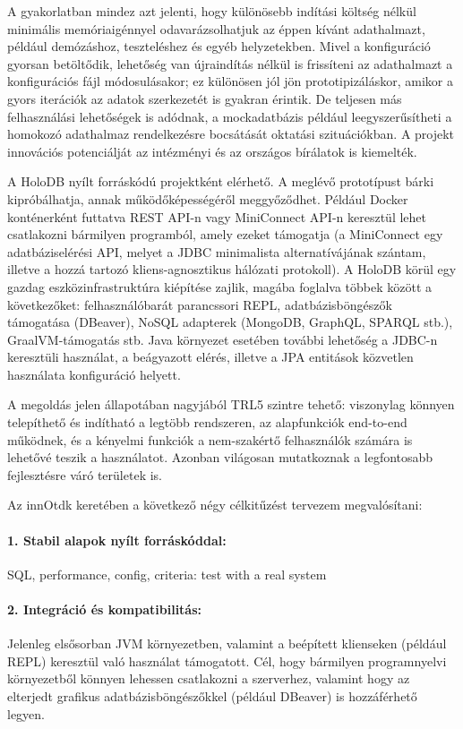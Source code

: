 \documentclass[12pt]{article}
\begin{document}
A gyakorlatban mindez azt jelenti, hogy különösebb indítási költség nélkül minimális memóriaigénnyel odavarázsolhatjuk az éppen kívánt adathalmazt, például demózáshoz, teszteléshez és egyéb helyzetekben.
Mivel a konfiguráció gyorsan betöltődik, lehetőség van újraindítás nélkül is frissíteni az adathalmazt a konfigurációs fájl módosulásakor; ez különösen jól jön prototipizáláskor, amikor a gyors iterációk az adatok szerkezetét is gyakran érintik.
De teljesen más felhasználási lehetőségek is adódnak, a mockadatbázis például leegyszerűsítheti a homokozó adathalmaz rendelkezésre bocsátását oktatási szituációkban.
A projekt innovációs potenciálját az intézményi és az országos bírálatok is kiemelték.

A HoloDB nyílt forráskódú projektként elérhető.
A meglévő prototípust bárki kipróbálhatja, annak működőképességéről meggyőződhet.
Például Docker konténerként futtatva REST API-n vagy MiniConnect API-n keresztül lehet csatlakozni bármilyen programból, amely ezeket támogatja
(a MiniConnect egy adatbáziselérési API, melyet a JDBC minimalista alternatívájának szántam, illetve a hozzá tartozó kliens-agnosztikus hálózati protokoll).
A HoloDB körül egy gazdag eszközinfrastruktúra kiépítése zajlik, magába foglalva többek között a következőket: felhasználóbarát parancssori REPL, adatbázisböngészők támogatása (DBeaver), NoSQL adapterek (MongoDB, GraphQL, SPARQL stb.), GraalVM-támogatás stb.
Java környezet esetében további lehetőség a JDBC-n keresztüli használat,
a beágyazott elérés, illetve a JPA entitások közvetlen használata konfiguráció helyett.

A megoldás jelen állapotában nagyjából TRL5 szintre tehető:
viszonylag könnyen telepíthető és indítható a legtöbb rendszeren,
az alapfunkciók end-to-end működnek,
és a kényelmi funkciók a nem-szakértő felhasználók számára is lehetővé teszik a használatot.
Azonban világosan mutatkoznak a legfontosabb fejlesztésre váró területek is.

Az innOtdk keretében a következő négy célkitűzést tervezem megvalósítani:

\paragraph{1. Stabil alapok nyílt forráskóddal:}{
SQL, performance, config, criteria: test with a real system
}

\paragraph{2. Integráció és kompatibilitás:}{
Jelenleg elsősorban JVM környezetben, valamint a beépített klienseken (például REPL) keresztül való használat támogatott.
Cél, hogy bármilyen programnyelvi környezetből könnyen lehessen csatlakozni a szerverhez,
valamint hogy az elterjedt grafikus adatbázisböngészőkkel (például DBeaver) is hozzáférhető legyen.
}
\end{document}
